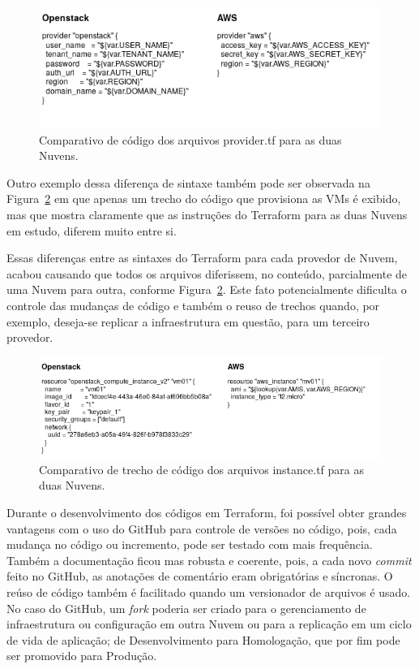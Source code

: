 \documentclass[12pt]{article}
\begin{document}
	\begin{figure}[H]
		\centering
		\includegraphics[width=0.8\linewidth]{figuras/Figure3b.png}
		\caption{Comparativo de código dos arquivos provider.tf para as duas Nuvens.}
		\label{fig:figure3b}
	\end{figure}
	
	Outro exemplo dessa diferença de sintaxe também pode ser observada na Figura~\ref{fig:figure3} em que apenas um trecho do código que provisiona as VMs é exibido, mas que mostra claramente que as instruções do Terraform para as duas Nuvens em estudo, diferem muito entre si.
	
	Essas diferenças entre as sintaxes do Terraform para cada provedor de Nuvem, acabou causando que todos os arquivos diferissem, no conteúdo, parcialmente de uma Nuvem para outra, conforme Figura~\ref{fig:figure3}. Este fato potencialmente dificulta o controle das mudanças de código e também o reuso de trechos quando, por exemplo, deseja-se replicar a infraestrutura em questão, para um terceiro provedor.
		
	\begin{figure}[ht]
		\centering
		\includegraphics[width=0.97\linewidth]{figuras/Figure3.png}
		\caption{Comparativo de trecho de código dos arquivos instance.tf para as duas Nuvens.}
		\label{fig:figure3}
	\end{figure}

	Durante o desenvolvimento dos códigos em Terraform, foi possível obter grandes vantagens com o uso do GitHub para controle de versões no código, pois, cada mudança no código ou incremento, pode ser testado com mais frequência. Também a documentação ficou mas robusta e coerente, pois, a cada novo \textit{commit} feito no GitHub, as anotações de comentário eram obrigatórias e síncronas. O reúso de código também é facilitado quando um versionador de arquivos é usado. No caso do GitHub, um \textit{fork} poderia ser criado para o gerenciamento de infraestrutura ou configuração em outra Nuvem ou para a replicação em um ciclo de vida de aplicação; de Desenvolvimento para Homologação, que por fim pode ser promovido para Produção.
	
\end{document}
